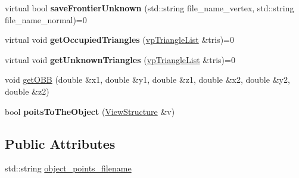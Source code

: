 \begin{DoxyCompactItemize}
\item 
virtual bool {\bfseries save\+Frontier\+Unknown} (std\+::string file\+\_\+name\+\_\+vertex, std\+::string file\+\_\+name\+\_\+normal)=0\hypertarget{classPartialModelBase_a5f71113c57da42c730929af0eb6d59ba}{}\label{classPartialModelBase_a5f71113c57da42c730929af0eb6d59ba}

\item 
virtual void {\bfseries get\+Occupied\+Triangles} (\hyperlink{classvpTriangleList}{vp\+Triangle\+List} \&tris)=0\hypertarget{classPartialModelBase_af66511a5e5679937fd4b393fb11a49ed}{}\label{classPartialModelBase_af66511a5e5679937fd4b393fb11a49ed}

\item 
virtual void {\bfseries get\+Unknown\+Triangles} (\hyperlink{classvpTriangleList}{vp\+Triangle\+List} \&tris)=0\hypertarget{classPartialModelBase_a4dc17a79b5713384c08561bc74b416c0}{}\label{classPartialModelBase_a4dc17a79b5713384c08561bc74b416c0}

\item 
void \hyperlink{classPartialModelBase_a60fa44bbde343902f8adfce270b27b87}{get\+O\+BB} (double \&x1, double \&y1, double \&z1, double \&x2, double \&y2, double \&z2)
\item 
bool {\bfseries poits\+To\+The\+Object} (\hyperlink{classViewStructure}{View\+Structure} \&v)\hypertarget{classPartialModelBase_af0c4f683c0d35469b366d91c5851022a}{}\label{classPartialModelBase_af0c4f683c0d35469b366d91c5851022a}

\end{DoxyCompactItemize}
\subsection*{Public Attributes}
\begin{DoxyCompactItemize}
\item 
std\+::string \hyperlink{classPartialModelBase_a7baf1e6dfaaf4891b6ac03cbafc7e4d2}{object\+\_\+points\+\_\+filename}
\end{DoxyCompactItemize}
